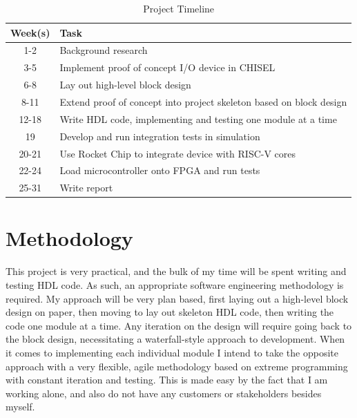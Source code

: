 \documentclass[a4paper,fleqn,12pt]{article}
\begin{document}
\begin{table}[h!]
    \centering
    \begin{tabular}{|c|l|}
        \hline
        \textbf{Week(s)} & \textbf{Task}                                                       \\ \hline
        1-2              & Background research                                                 \\ \hline
        3-5              & Implement proof of concept I/O device in CHISEL                     \\ \hline
        6-8              & Lay out high-level block design                                     \\ \hline
        8-11             & Extend proof of concept into project skeleton based on block design \\ \hline
        12-18            & Write HDL code, implementing and testing one module at a time       \\ \hline
        19               & Develop and run integration tests in simulation                     \\ \hline
        20-21            & Use Rocket Chip to integrate device with RISC-V cores               \\ \hline
        22-24            & Load microcontroller onto FPGA and run tests                        \\ \hline
        25-31            & Write report                                                        \\ \hline
    \end{tabular}
    \caption{Project Timeline}
    \label{tab:timeline}
\end{table}

\section{Methodology}
This project is very practical, and the bulk of my time will be spent writing and testing HDL code. As such, an appropriate software engineering methodology is required. My approach will be very plan based, first laying out a high-level block design on paper, then moving to lay out skeleton HDL code, then writing the code one module at a time. Any iteration on the design will require going back to the block design, necessitating a waterfall-style approach to development. When it comes to implementing each individual module I intend to take the opposite approach with a very flexible, agile methodology based on extreme programming with constant iteration and testing. This is made easy by the fact that I am working alone, and also do not have any customers or stakeholders besides myself.
\end{document}
